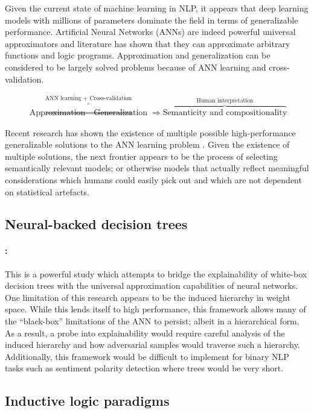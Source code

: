 Given the current state of machine learning in NLP, it appears that deep learning models with millions of parameters dominate the field in terms of generalizable performance. Artificial Neural Networks (ANNs) are indeed powerful universal approximators and literature has shown that they can approximate arbitrary functions and logic programs. Approximation and generalization can be considered to be largely solved problems because of ANN learning and cross-validation.

\begin{gather}
  \overbrace{\text{Approximation} \Rightarrow \text{Generalization}}^{\text{ANN learning + Cross-validation}} \Rightarrow \overbrace{\text{Semanticity and compositionality}}^{\text{Human interpretation}}
\end{gather}

Recent research has shown the existence of multiple possible high-performance generalizable solutions to the ANN learning problem \citep{kepner2018sparse}. Given the existence of multiple solutions, the next frontier appears to be the process of selecting semantically relevant models; or otherwise models that actually reflect meaningful considerations which humans could easily pick out and which are not dependent on statistical artefacts.

\subsection{Neural-backed decision trees}

\paragraph{\citealt{wan2020nbdt}:} This is a powerful study which attempts to bridge the explainability of white-box decision trees with the universal approximation capabilities of neural networks. One limitation of this research appears to be the induced hierarchy in weight space. While this lends itself to high performance, this framework allows many of the ``black-box'' limitations of the ANN to persist; albeit in a hierarchical form. As a result, a probe into explainability would require careful analysis of the induced hierarchy and how adversarial samples would traverse such a hierarchy. Additionally, this framework would be difficult to implement for binary NLP tasks such as sentiment polarity detection where trees would be very short.

\subsection{Inductive logic paradigms}

